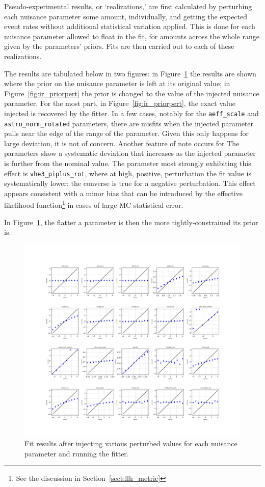 \documentclass[main.tex]{subfiles}
\begin{document}
Pseudo-experimental results, or `realizations,' are first calculated by perturbing each nuisance parameter some amount, individually, and getting the expected event rates without additional statistical variation applied. 
This is done for each nuisance parameter allowed to float in the fit, for amounts across the whole range given by the parameters' priors. 
Fits are then carried out to each of these realizations.

The results are tabulated below in two figures: in Figure~\ref{fig:ir_nopriorpert} the results are shown where the prior on the nuisance parameter is left at its original value; in Figure~\ref{fig:ir_priorpert} the prior is changed to the value of the injected nuisance parameter. 
For the most part, in Figure~\ref{fig:ir_priorpert}, the exact value injected is recovered by the fitter. 
In a few cases, notably for the \texttt{aeff\_scale} and \texttt{astro\_norm\_rotated} parameters, there are misfits when the injected parameter pulls near the edge of the range of the parameter.
Given this only happens for large deviation, it is not of concern. 
Another feature of note occurs for
The parameters show a systematic deviation that increases as the injected parameter is further from the nominal value. 
The parameter most strongly exhibiting this effect is \texttt{vhe3\_piplus\_rot}, where at high, positive, perturbation the fit value is systematically lower; the converse is true for a negative perturbation. 
This effect appears consistent with a minor bias that can be introduced by the effective likelihood function\footnote{See the discussion in Section~\ref{sect:llh_metric}} in cases of large MC statistical error.  

In Figure~\ref{fig:ir_nopriorpert}, the flatter a parameter is then the more tightly-constrained its prior is. 

\begin{figure}
    \centering 
    \includegraphics[width=0.7\linewidth]{figures/inject_recover_syst.png}
    \caption{Fit results after injecting various perturbed values for each nuisance parameter and running the fitter. }\label{fig:ir_nopriorpert}
\end{figure}
\end{document}

